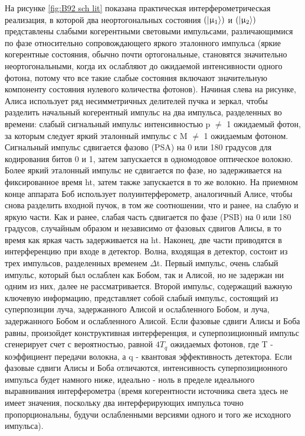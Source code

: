 На рисунке \ref{fig:B92 sch lit} показана практическая интерферометрическая реализация, в которой два неортогональных состояния $(\lvert\upmu_1\rangle)$ и $(\lvert\upmu_2\rangle)$ представлены слабыми когерентными световыми импульсами, различающимися по фазе относительно сопровождающего яркого эталонного импульса (яркие когерентные состояния, обычно почти ортогональные, становятся значительно неортогональными, когда их ослабляют до ожидаемой интенсивности одного фотона, потому что все такие слабые состояния включают значительную компоненту состояния нулевого количества фотонов). Начиная слева на рисунке, Алиса использует ряд несимметричных делителей пучка и зеркал, чтобы разделить начальный когерентный импульс на два импульса, разделенных во времени: слабый сигнальный импульс интенсивностью p $\neq$ 1 ожидаемый фотон, за которым следует яркий эталонный импульс с M $\neq$ 1 ожидаемым фотоном. Сигнальный импульс сдвигается фазово (PSA) на 0 или 180 градусов для кодирования битов 0 и 1, затем запускается в одномодовое оптическое волокно. Более яркий эталонный импульс не сдвигается по фазе, но задерживается на фиксированное время ht, затем также запускается в то же волокно. На приемном конце аппарата Боб использует полуинтерферометр, аналогичный Алисе, чтобы снова разделить входной пучок, в том же соотношении, что и ранее, на слабую и яркую части. Как и ранее, слабая часть сдвигается по фазе (PSB) на 0 или 180 градусов, случайным образом и независимо от фазовых сдвигов Алисы, в то время как яркая часть задерживается на ht. Наконец, две части приводятся в интерференцию при входе в детектор.
Волна, входящая в детектор, состоит из трех импульсов, разделенных временем $\Delta$t. Первый импульс, очень слабый импульс, который был ослаблен как Бобом, так и Алисой, но не задержан ни одним из них, далее не рассматривается.
Второй импульс, содержащий важную ключевую информацию, представляет собой слабый импульс, состоящий из суперпозиции луча, задержанного Алисой и ослабленного Бобом, и луча, задержанного Бобом и ослабленного Алисой. Если фазовые сдвиги Алисы и Боба равны, произойдет конструктивная интерференция, и суперпозиционный импульс сгенерирует счет с вероятностью, равной $4T_q$ ожидаемых фотонов, где T - коэффициент передачи волокна, а q - квантовая эффективность детектора. Если фазовые сдвиги Алисы и Боба отличаются, интенсивность суперпозиционного импульса будет намного ниже, идеально - ноль в пределе идеального выравнивания интерферометра (время когерентности источника света здесь не имеет значения, поскольку два интерферирующих импульса точно пропорциональны, будучи ослабленными версиями одного и того же исходного импульса).
